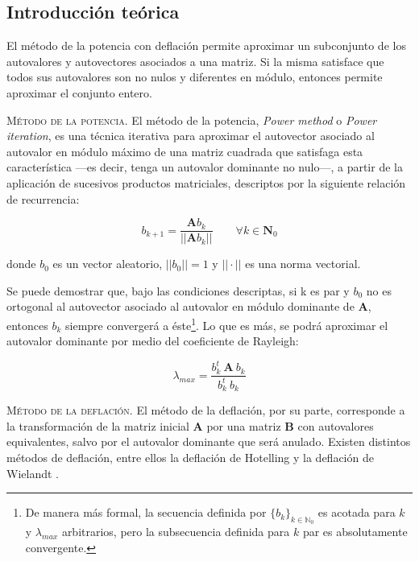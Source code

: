 
\vspace{1em}
\subsection{Introducción teórica} El método de la potencia con deflación permite aproximar un subconjunto de los autovalores y autovectores asociados a una matriz. Si la misma satisface que todos sus autovalores son no nulos y diferentes en módulo, entonces permite aproximar el conjunto entero. 


\vspace{2em}
\noindent \textsc{Método de la potencia}. El método de la potencia, \textit{Power method} o \textit{Power iteration}, es una técnica iterativa para aproximar el autovector asociado al autovalor en módulo máximo de una matriz cuadrada que satisfaga esta característica ---es decir, tenga un autovalor dominante no nulo---, a partir de la aplicación de sucesivos productos matriciales, descriptos por la siguiente relación de recurrencia:

\begin{equation} \label{potencia}
    b_{k+1} = \frac{\mathbf{A}b_k}{||\mathbf{A}b_k||} \qquad \forall k \in \mathbf{N}_0
\end{equation}

\vspace{1em}
\noindent donde $b_0$ es un vector aleatorio, $||b_0|| = 1$ y $|| \cdot ||$ es una norma vectorial.

\vspace{1em}
Se puede demostrar \cite{Burden} que, bajo las condiciones descriptas, si k es par y $b_0$ no es ortogonal al autovector asociado al autovalor en módulo dominante de \textbf{A}, entonces $b_k$ siempre convergerá a éste\footnote{De manera más formal, la secuencia definida por $\{b_k\}_{k \in \mathbb{N}_0}$ es acotada para $k$ y $\lambda_{max}$ arbitrarios, pero la subsecuencia definida para $k$ par es absolutamente convergente.}. Lo que es más, se podrá aproximar el autovalor dominante por medio del coeficiente de Rayleigh:

\vspace{1em}
\begin{equation} \label{rayleigh}
    \lambda_{max} = \frac{b_k^t\ \mathbf{A}\ b_k}{b_k^t\ b_k}
\end{equation}


\vspace{2em}
\noindent \textsc{Método de la deflación}. El método de la deflación, por su parte, corresponde a la transformación de la matriz inicial \textbf{A} por una matriz \textbf{B} con autovalores equivalentes, salvo por el autovalor dominante que será anulado. Existen distintos métodos de deflación, entre ellos la deflación de Hotelling y la deflación de Wielandt \cite{Burden}.  

